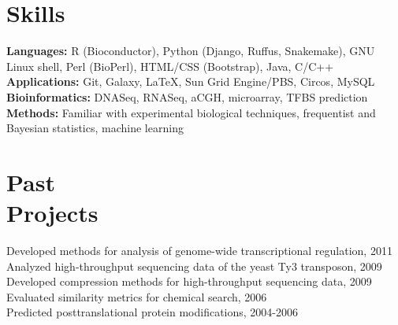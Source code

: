 \documentclass[margin,line]{res}
\begin{document}
\begin{resume}
\section{\sc Skills} 
\textbf{Languages:} R (Bioconductor), Python (Django, Ruffus, Snakemake), GNU Linux shell, Perl (BioPerl), HTML/CSS (Bootstrap), Java, C/C++\\
\textbf{Applications:} Git, Galaxy, \LaTeX, Sun Grid Engine/PBS, Circos, MySQL\\
\textbf{Bioinformatics:} DNASeq, RNASeq, aCGH, microarray, TFBS prediction\\
\textbf{Methods:} Familiar with experimental biological techniques, frequentist and Bayesian statistics, machine learning


\section{\sc Past\\Projects}
Developed methods for analysis of genome-wide transcriptional regulation, 2011 \\
Analyzed high-throughput sequencing data of the yeast Ty3 transposon, 2009\\
Developed compression methods for high-throughput sequencing data, 2009 \\
Evaluated similarity metrics for chemical search, 2006\\
Predicted posttranslational protein modifications, 2004-2006


\end{resume}
\end{document}
